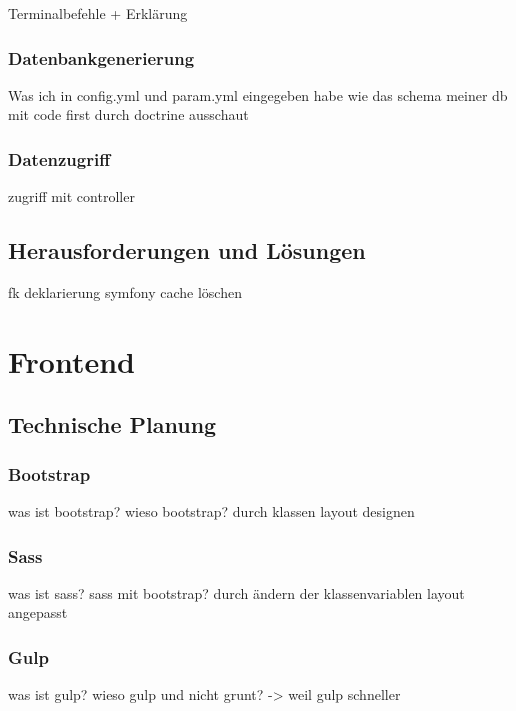 Terminalbefehle + Erklärung

    \subsubsection{Datenbankgenerierung}

Was ich in config.yml und param.yml eingegeben habe
wie das schema meiner db mit code  first durch doctrine ausschaut

    \subsubsection{Datenzugriff}

zugriff mit controller

  \subsection{Herausforderungen und Lösungen}

fk deklarierung
symfony cache löschen

\section{Frontend}

  \subsection{Technische Planung}

    \subsubsection{Bootstrap}

was ist bootstrap? wieso bootstrap? durch klassen layout designen

    \subsubsection{Sass}

was ist sass? sass mit bootstrap?
durch ändern der klassenvariablen layout angepasst

    \subsubsection{Gulp}

was ist gulp? wieso gulp und nicht grunt? -> weil gulp schneller

